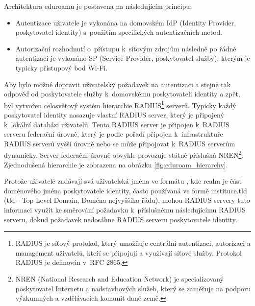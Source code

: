 \documentclass[thesis=M,czech]{FITthesis}[2012/06/26]
\begin{document}
\begin{introduction}
  Architektura eduroamu je postavena na následujícím principu:
  \begin{itemize}
    \item{Autentizace uživatele je vykonána na domovském IdP (Identity Provider, poskytovatel identity)
      s~použitím specifických autentizačních metod.} 
    \item{Autorizační rozhodnutí o~přístupu k~síťovým zdrojům následně po řádné autentizaci 
    je vykonáno SP (Service Provider, poskytovatel služby), kterým je typicky přístupový bod Wi-Fi.}
  \end{itemize}
  Aby bylo možné dopravit uživatelský požadavek na autentizaci a stejně tak odpověď 
  od poskytovatele služby k~domovskému poskytovateli identity a zpět, byl vytvořen celosvětový systém hierarchie RADIUS\footnote{
    RADIUS je síťový protokol, který umožňuje centrální autentizaci, autorizaci a management uživatelů, 
    kteří se připojují a využívají síťové služby.
    Protokol RADIUS je definován v~RFC 2865.
  }
  serverů.
  Typicky každý poskytovatel identity nasazuje vlastní RADIUS server, který je připojený k~lokální databázi
  uživatelů.
  Tento RADIUS server je připojen k~RADIUS serveru federační úrovně, který je podle pořadí připojen k~infrastruktuře RADIUS serverů vyšší úrovně
  nebo se může připojovat k~RADIUS serverům dynamicky. \cite{geant1} 
  Server federační úrovně obvykle provozuje státně příslušná NREN\footnote{
    NREN (National Research and Education Network) je specializovaný poskytovatel Internetu a nadstavbových služeb, 
    který se zaměřuje na podporu výzkumných a vzdělávacích komunit dané země.
  }.
  Zjednodušená hierarchie je zobrazena na obrázku \ref{fig:eduroam_hierarchy}.

  Protože uživatelé zadávají svá uživatelská jména ve formátu , 
  kde realm je část doménového jména poskytovatele identity, často používaná ve formě instituce.tld (tld - Top Level Domain, Doména nejvyššího řádu),
  mohou RADIUS servery tuto informaci využít ke směrování požadavku k~příslušnému následujícímu RADIUS serveru, 
  dokud požadavek nedosáhne RADIUS serveru poskytovatele identity. \cite{geant1}


\end{introduction}
\end{document}
